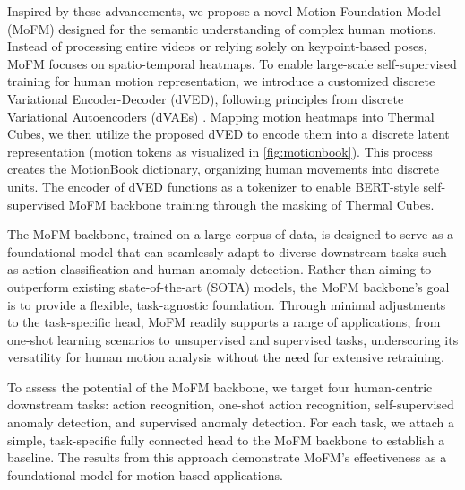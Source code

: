 Inspired by these advancements, we propose a novel Motion Foundation Model (MoFM) designed for the semantic understanding of complex human motions. Instead of processing entire videos or relying solely on keypoint-based poses, MoFM focuses on spatio-temporal heatmaps. To enable large-scale self-supervised training for human motion representation, we introduce a customized discrete Variational Encoder-Decoder (dVED), following principles from discrete Variational Autoencoders (dVAEs) \cite{vahdat2018dvae++, biswas2020dvae, vahdat2018dvae}. Mapping motion heatmaps into Thermal Cubes, we then utilize the proposed dVED to encode them into a discrete latent representation (motion tokens as visualized in \cref{fig:motionbook}). This process creates the MotionBook dictionary, organizing human movements into discrete units. The encoder of dVED functions as a tokenizer to enable BERT-style \cite{kenton2019bert} self-supervised MoFM backbone training through the masking of Thermal Cubes.



The MoFM backbone, trained on a large corpus of data, is designed to serve as a foundational model that can seamlessly adapt to diverse downstream tasks such as action classification and human anomaly detection. Rather than aiming to outperform existing state-of-the-art (SOTA) models, the MoFM backbone’s goal is to provide a flexible, task-agnostic foundation. Through minimal adjustments to the task-specific head, MoFM readily supports a range of applications, from one-shot learning scenarios to unsupervised and supervised tasks, underscoring its versatility for human motion analysis without the need for extensive retraining.

To assess the potential of the MoFM backbone, we target four human-centric downstream tasks: action recognition, one-shot action recognition, self-supervised anomaly detection, and supervised anomaly detection. For each task, we attach a simple, task-specific fully connected head to the MoFM backbone to establish a baseline. The results from this approach demonstrate MoFM’s effectiveness as a foundational model for motion-based applications.

